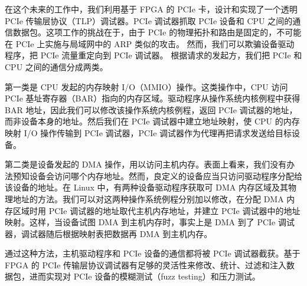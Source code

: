 在这个未来的工作中，我们利用基于 FPGA 的 PCIe 卡，设计和实现了一个透明 PCIe 传输层协议（TLP）调试器。PCIe 调试器抓取 PCIe 设备和 CPU 之间的通信数据包。这项工作的挑战在于，由于 PCIe 的物理拓扑和路由是固定的，不可能在 PCIe 上实施与局域网中的 ARP 类似的攻击。
然而，我们可以欺骗设备驱动程序，把 PCIe 流量重定向到 PCIe 调试器。
根据请求的发起方，我们把 PCIe 和 CPU 之间的通信分成两类。

第一类是 CPU 发起的内存映射 I/O（MMIO）操作。这类操作中，CPU 访问 PCIe 基址寄存器（BAR）指向的内存区域。驱动程序从操作系统内核例程中获得 BAR 地址，因此我们可以修改该操作系统内核例程，返回 PCIe 调试器的地址，而非设备本身的地址。然后我们在 PCIe 调试器中建立地址映射，使 CPU 的内存映射 I/O 操作传输到 PCIe 调试器，PCIe 调试器作为代理再把请求发送给目标设备。

第二类是设备发起的 DMA 操作，用以访问主机内存。表面上看来，我们没有办法预知设备会访问哪个内存地址。然而，良定义的设备应当只访问驱动程序分配给该设备的地址。在 Linux 中，有两种设备驱动程序获取可 DMA 内存区域及其物理地址的方法。我们可以对这两种操作系统例程分别加以修改，在分配 DMA 内存区域时用 PCIe 调试器的地址取代主机内存地址，并建立 PCIe 调试器中的地址映射。这样，当设备试图 DMA 到主机内存时，事实上是 DMA 到了 PCIe 调试器，调试器随后根据映射表把数据再 DMA 到主机内存。

通过这种方法，主机驱动程序和 PCIe 设备的通信都将被 PCIe 调试器截获。基于 FPGA 的 PCIe 传输层协议调试器有足够的灵活性来修改、统计、过滤和注入数据包，进而实现对 PCIe 设备的模糊测试（fuzz testing）和压力测试。